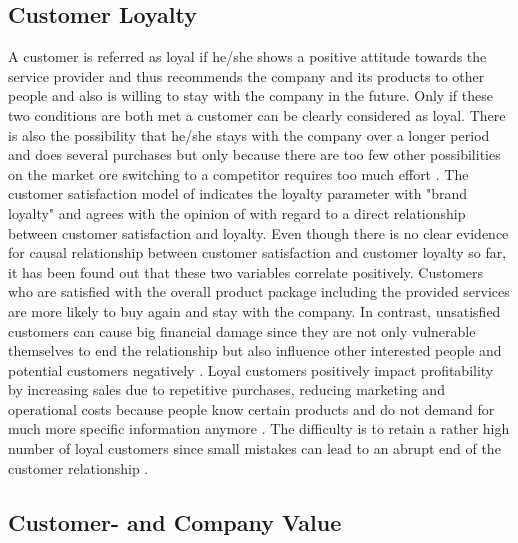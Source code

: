 \subsection{Customer Loyalty}
\label{ssec:custLoyalty}
A customer is referred as loyal if he/she shows a positive attitude towards the service provider and thus recommends the company and its products to other people and also is willing to stay with the company in the future. Only if these two conditions are both met a customer can be clearly considered as loyal. There is also the possibility that he/she stays with the company over a longer period and does several purchases but only because there are too few other possibilities on the market ore switching to a competitor requires too much effort \cite{neckel2015}.
The customer satisfaction model of \cite{hussain2015service} indicates the loyalty parameter with "brand loyalty" and agrees with the opinion of \cite{neckel2015} with regard to a direct relationship between customer satisfaction and loyalty. Even though there is no clear evidence for causal relationship between customer satisfaction and customer loyalty so far, it has been found out that these two variables correlate positively. Customers who are satisfied with the overall product package including the provided services are more likely to buy again and stay with the company. In contrast, unsatisfied customers can cause big financial damage since they are not only vulnerable themselves to end the relationship but also influence other interested people and potential customers negatively \cite{neckel2015}. Loyal customers positively impact profitability by increasing sales due to repetitive purchases, reducing marketing and operational costs because people know certain products and do not demand for much more specific information anymore \cite{bowen2001relationship}. The difficulty is to retain a rather high number of loyal customers since small mistakes can lead to an abrupt end of the customer relationship \cite{chen2003understanding}. 

\subsection{Customer- and Company Value}

